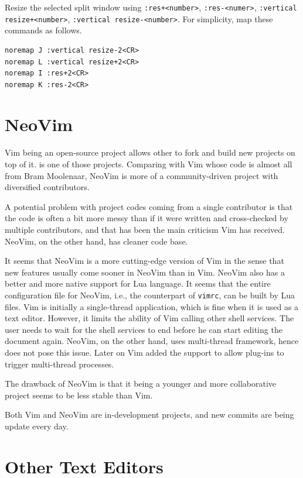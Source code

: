 Resize the selected split window using \verb|:res+<number>|, \verb|:res-<numer>|, \verb|:vertical resize+<number>|, \verb|:vertical resize-<number>|. For simplicity, map these commands as follows.
\begin{lstlisting}
noremap J :vertical resize-2<CR>
noremap L :vertical resize+2<CR>
noremap I :res+2<CR>
noremap K :res-2<CR>
\end{lstlisting}

\section{NeoVim}

Vim being an open-source project allows other to fork and build new projects on top of it.  is one of those projects. Comparing with Vim whose code is almost all from Bram Moolenaar, NeoVim is more of a community-driven project with diversified contributors. 

A potential problem with project codes coming from a single contributor is that the code is often a bit more messy than if it were written and cross-checked by multiple contributors, and that has been the main criticism Vim has received. NeoVim, on the other hand, has cleaner code base. 

It seems that NeoVim is a more cutting-edge version of Vim in the sense that new features usually come sooner in NeoVim than in Vim. NeoVim also has a better and more native support for Lua language. It seems that the entire configuration file for NeoVim, i.e., the counterpart of \verb|vimrc|, can be built by Lua files. Vim is initially a single-thread application, which is fine when it is used as a text editor. However, it limits the ability of Vim calling other shell services. The user needs to wait for the shell services to end before he can start editing the document again. NeoVim, on the other hand, uses multi-thread framework, hence does not pose this issue. Later on Vim added the support to allow plug-ins to trigger multi-thread processes.

The drawback of NeoVim is that it being a younger and more collaborative project seems to be less stable than Vim.

Both Vim and NeoVim are in-development projects, and new commits are being update every day. 

\section{Other Text Editors}

